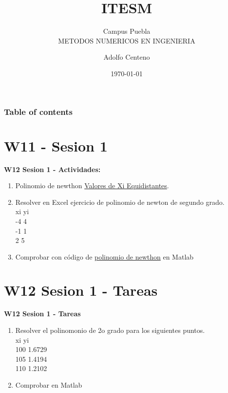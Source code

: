 \documentclass{beamer}
\begin{document}
\title{ITESM}  
\subtitle{Campus Puebla\\METODOS NUMERICOS EN INGENIERIA
}
\author{Adolfo Centeno}
\date{\today} 


\begin{frame}
\titlepage
\end{frame}

\begin{frame}\frametitle{Table of contents}
\tableofcontents
\end{frame} 


\section{W11 - Sesion 1 }

\begin{frame}

\textbf{W12 Sesion 1 - Actividades:}

\begin{enumerate}
\item
	 Polinomio de newthon \href{https://www.youtube.com/watch?v=WgZvz57c5CQ}{Valores de Xi Equidistantes}.

\item
	Resolver en Excel  ejercicio de polinomio de newton de segundo grado. \\
	
	xi	yi \\
-4	4 \\
-1	1 \\
2	5

\item Comprobar con código de \href{https://www.youtube.com/watch?v=WgZvz57c5CQ}{polinomio de newthon} en Matlab
\end{enumerate} 

\end{frame}


\section{W12 Sesion 1 - Tareas }

\begin{frame}


\textbf{W12 Sesion 1 - Tareas}


\begin{enumerate}
\item

Resolver el polinomonio de 2o grado para los siguientes puntos. \\

xi	yi \\
100	1.6729 \\
105	1.4194 \\
110	1.2102

\item
	Comprobar en Matlab


\end{enumerate} 


\end{frame}
\end{document}

